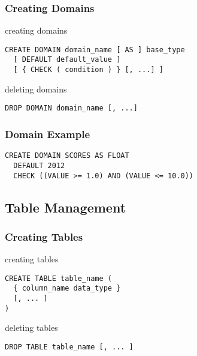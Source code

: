 \documentclass[dvipsnames]{beamer}
\theoremstyle{plain}
\begin{document}
\begin{frame}[fragile]
  \frametitle{Creating Domains}

  \begin{block}{creating domains}
    \begin{lstlisting}
CREATE DOMAIN domain_name [ AS ] base_type
  [ DEFAULT default_value ]
  [ { CHECK ( condition ) } [, ...] ]
    \end{lstlisting}
  \end{block}

  \pause
  \medskip
  \begin{block}{deleting domains}
    \begin{lstlisting}
DROP DOMAIN domain_name [, ...]
    \end{lstlisting}
  \end{block}
\end{frame}

\begin{frame}[fragile]
  \frametitle{Domain Example}

  \begin{example}
    \begin{lstlisting}
CREATE DOMAIN SCORES AS FLOAT
  DEFAULT 2012
  CHECK ((VALUE >= 1.0) AND (VALUE <= 10.0))
    \end{lstlisting}
  \end{example}
\end{frame}

\subsection{Table Management}

\begin{frame}[fragile]
  \frametitle{Creating Tables}

  \begin{block}{creating tables}
    \begin{lstlisting}
CREATE TABLE table_name (
  { column_name data_type }
  [, ... ]
)
    \end{lstlisting}
  \end{block}

  \pause
  \medskip
  \begin{block}{deleting tables}
    \begin{lstlisting}
DROP TABLE table_name [, ... ]
    \end{lstlisting}
  \end{block}
\end{frame}
\end{document}
